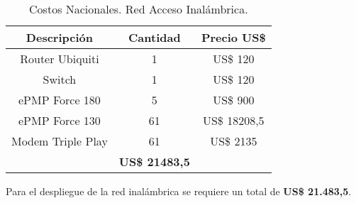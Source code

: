 \begin{table}[H]
  \scriptsize
  \centering
    \begin{tabular}{|c|c|c|}
    \hline
    \rowcolor[HTML]{C5D9F1} \textbf{Descripción} & \textbf{Cantidad} & \textbf{Precio US\$} \bigstrut\\
    \hline
    Router Ubiquiti & 1     & US\$ 120 \bigstrut\\
    \hline
    Switch & 1     & US\$ 120 \bigstrut\\
    \hline
    ePMP Force 180 & 5     & US\$ 900 \bigstrut\\
    \hline
    ePMP Force 130 & 61    & US\$ 18208,5 \bigstrut\\
    \hline
    Modem Triple Play & 61    & US\$ 2135 \bigstrut\\
    \hline
    \rowcolor[HTML]{C5D9F1} \multicolumn{2}{|c|}{\textbf{Total}} & \textbf{US\$ 21483,5} \bigstrut\\
    \hline
    \end{tabular}%
    \caption{Costos Nacionales. Red Acceso Inalámbrica.}
  \label{tab:costo-red-acceso}%
\end{table}%


Para el despliegue de la red inalámbrica se requiere un total de  \textbf{US\$ 21.483,5}.

\newpage







